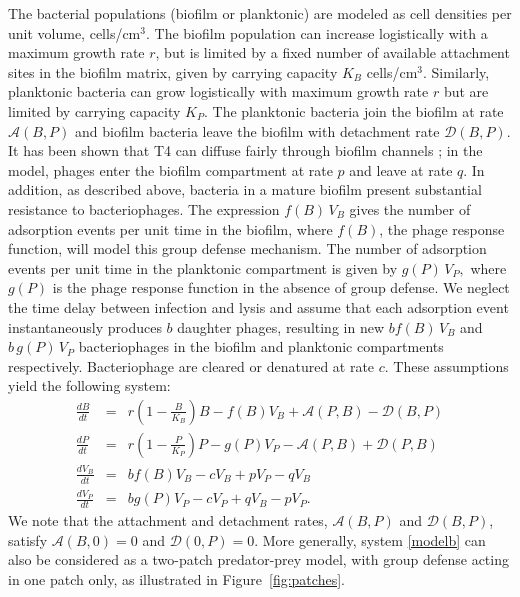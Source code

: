 The bacterial populations (biofilm or planktonic) are modeled as cell densities per unit volume, cells/cm$^3$. The biofilm population can increase logistically with a maximum growth rate $r$, but is limited by a fixed number of available attachment sites in the biofilm matrix, given by carrying capacity $K_{B}$ cells/cm$^3$.  Similarly,  planktonic bacteria can grow logistically with maximum growth rate $r$ but are limited by carrying capacity $K_P$. The planktonic bacteria join the biofilm at rate $\mathcal{A}(B,P)$ and biofilm bacteria leave the biofilm with detachment rate $\mathcal{D}(B,P)$. It has been shown that T4 can diffuse fairly through biofilm channels \citep{doolittle_tracing_1996}; in the model, phages enter the biofilm compartment at rate $p$ and leave at rate $q$. In addition, as described above, bacteria in a mature biofilm present substantial resistance to bacteriophages. The expression $f(B)\,V_B$ gives the number of adsorption events per unit time in the biofilm, where $f(B)$, the phage response function, will model this group defense mechanism. The number of adsorption events per unit time in the planktonic compartment is given by $g(P)\,V_{P},$ where $g(P)$ is the phage response function in the absence of group defense. We neglect the time delay between infection and lysis and assume that each adsorption event instantaneously produces $b$ daughter phages, resulting in new $b f(B)\,V_{B}$ and $b\,g(P)\,V_{P}$ bacteriophages in the biofilm and planktonic compartments respectively. Bacteriophage are cleared or denatured at rate $c$. 
These assumptions yield the following system:
\begin{eqnarray}\label{modelb}
\frac{dB}{dt} &=& r\left(1-\frac{B}{K_{B}}\right)B-f(B) V_{B} +\mathcal{A}(P,B)-\mathcal{D}(B,P)\nonumber\\
\frac{dP}{dt} &=& r\left(1-\frac{P}{K_{P}}\right)P- g(P)V_{P}-\mathcal{A}(P,B)+\mathcal{D}(P,B)\nonumber\\
\frac{d V_{B}}{dt} &=& bf(B)V_{B}-cV_{B}+p V_{P}-qV_{B}\nonumber\\
\frac{d V_{P}}{dt} &=& bg(P)V_{P}-cV_{P}+q V_{B}-p V_{P}.
\end{eqnarray}
We note that the attachment and detachment rates, $\mathcal{A}(B,P)$ and $\mathcal{D}(B,P)$, satisfy $\mathcal{A}(B,0)=0$ and $\mathcal{D}(0,P)=0$.
More generally, system \ref{modelb} can also be considered as a two-patch predator-prey model, with group defense acting in one patch only, as illustrated in Figure~\ref{fig:patches}. 
